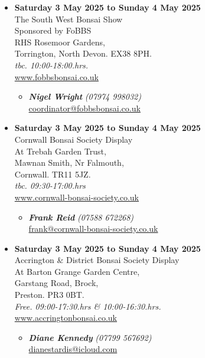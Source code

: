 \begin{itemize}
    \item \textbf{Saturday 3 May 2025 to Sunday 4 May 2025}
    \\
    The South West Bonsai Show \\
    Sponsored by FoBBS \\
    RHS Rosemoor Gardens, \\
    Torrington, North Devon. EX38 8PH.
    \\
    \emph{tbc. 10:00-18:00.hrs.}
    \\
    \href{https://www.fobbsbonsai.co.uk}{www.fobbsbonsai.co.uk}
    \begin{itemize}
        \item \textbf{\emph{Nigel Wright}} \emph{(07974 998032)} \\
        \href{mailto:coordinator@fobbsbonsai.co.uk}{coordinator@fobbsbonsai.co.uk} 
    \end{itemize}

    \item \textbf{Saturday 3 May 2025 to Sunday 4 May 2025}
    \\
    Cornwall Bonsai Society Display \\
    At Trebah Garden Trust, \\
    Mawnan Smith, Nr Falmouth, \\
    Cornwall. TR11 5JZ.
    \\
    \emph{tbc. 09:30-17:00.hrs}
    \\
    \href{https://www.cornwall-bonsai-society.co.uk}{www.cornwall-bonsai-society.co.uk}
    \begin{itemize}
        \item \textbf{\emph{Frank Reid}} \emph{(07588 672268)} \\
        \href{mailto:frank@cornwall-bonsai-society.co.uk}{frank@cornwall-bonsai-society.co.uk} 
    \end{itemize}

    \item \textbf{Saturday 3 May 2025 to Sunday 4 May 2025}
    \\
    Accrington \& District Bonsai Society Display \\
    At Barton Grange Garden Centre, \\
    Garstang Road, Brock, \\
    Preston. PR3 0BT.
    \\
    \emph{Free. 09:00-17:30.hrs \& 10:00-16:30.hrs.}
    \\
    \href{https://www.accringtonbonsai.co.uk}{www.accringtonbonsai.co.uk}
    \begin{itemize}
        \item \textbf{\emph{Diane Kennedy}} \emph{(07799 567692)} \\
        \href{mailto:dianestardis@icloud.com}{dianestardis@icloud.com} 
    \end{itemize}


\end{itemize}
